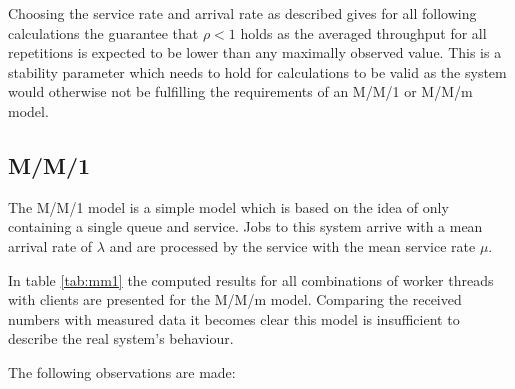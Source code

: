     Choosing the service rate and arrival rate as described gives for all following calculations the guarantee that
    $\rho < 1$ holds as the averaged throughput for all repetitions is expected to be lower than any maximally
    observed value. This is a stability parameter which needs to hold for calculations to be valid as the system would
    otherwise not be fulfilling the requirements of an M/M/1 or M/M/m model.

    \subsection{M/M/1\label{subsec:7_mm1}}
        The M/M/1 model is a simple model which is based on the idea of only containing a single queue and service. Jobs to
        this system arrive with a mean arrival rate of $\lambda$ and are processed by the service with the mean service
        rate $\mu$.

        In table \ref{tab:mm1} the computed results for all combinations of worker threads with clients are presented
        for the M/M/m model. Comparing the received numbers with measured data it becomes clear this model is
        insufficient to describe the real system's behaviour.

        The following observations are made:

